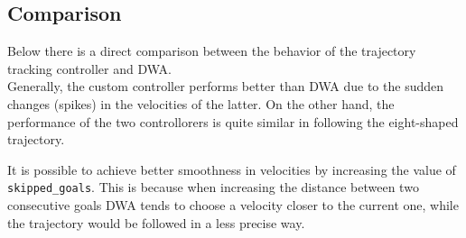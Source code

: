 \documentclass[11pt,a4paper]{article}
\begin{document}

\subsection{Comparison}

Below there is a direct comparison between the behavior of the trajectory tracking controller and DWA.\\

Generally, the custom controller performs better than DWA due to the sudden changes (spikes) in the velocities
of the latter.
On the other hand, the performance of the two controllorers is quite similar in following the eight-shaped trajectory.

It is possible to achieve better smoothness in velocities by increasing the value of \texttt{skipped\_goals}.
This is because when increasing the distance between two consecutive goals DWA tends to choose a velocity closer to
the current one, while the trajectory would be followed in a less precise way.
\end{document}

